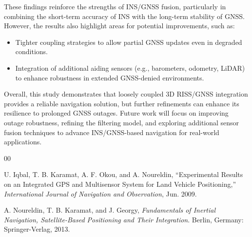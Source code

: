 \documentclass[conference]{IEEEtran}
\begin{document}
These findings reinforce the strengths of INS/GNSS fusion, particularly in combining the short-term accuracy of INS with the long-term stability of GNSS. However, the results also highlight areas for potential improvements, such as:
\begin{itemize}
    \item Tighter coupling strategies to allow partial GNSS updates even in degraded conditions.
    \item Integration of additional aiding sensors (e.g., barometers, odometry, LiDAR) to enhance robustness in extended GNSS-denied environments.
\end{itemize}

Overall, this study demonstrates that loosely coupled 3D RISS/GNSS integration provides a reliable navigation solution, but further refinements can enhance its resilience to prolonged GNSS outages. Future work will focus on improving outage robustness, refining the filtering model, and exploring additional sensor fusion techniques to advance INS/GNSS-based navigation for real-world applications.

\begin{thebibliography}{00}

 U. Iqbal, T. B. Karamat, A. F. Okou, and A. Noureldin, 
``Experimental Results on an Integrated GPS and Multisensor System for Land Vehicle Positioning,'' 
\textit{International Journal of Navigation and Observation}, Jun. 2009.

 A. Noureldin, T. B. Karamat, and J. Georgy, \textit{Fundamentals of Inertial Navigation, Satellite-Based Positioning and Their Integration}. Berlin, Germany: Springer-Verlag, 2013. 

\end{thebibliography}
\end{document}
